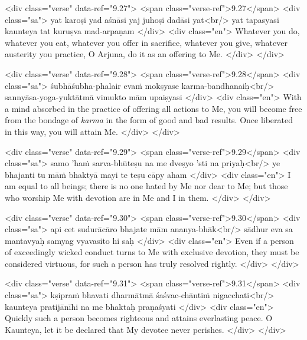 \begin{html}
<div class="verse" data-ref="9.27">
  <span class="verse-ref">9.27</span>
  <div class="sa">
    yat karoṣi yad aśnāsi yaj juhoṣi dadāsi yat<br/>
    yat tapasyasi kaunteya tat kuruṣva mad-arpaṇam
  </div>
  <div class="en">
    Whatever you do, whatever you eat, whatever you offer in sacrifice, whatever you give, whatever austerity you practice, O Arjuna, do it as an offering to Me.
  </div>
</div>
\end{html}



\begin{html}
<div class="verse" data-ref="9.28">
  <span class="verse-ref">9.28</span>
  <div class="sa">
    śubhāśubha-phalair evaṁ mokṣyase karma-bandhanaiḥ<br/>
    sannyāsa-yoga-yuktātmā vimukto mām upaiṣyasi
  </div>
  <div class="en">
    With a mind absorbed in the practice of offering all actions to Me, you will become free from the bondage of \textit{karma} in the form of good and bad results. Once liberated in this way, you will attain Me.
  </div>
</div>
\end{html}



\begin{html}
<div class="verse" data-ref="9.29">
  <span class="verse-ref">9.29</span>
  <div class="sa">
    samo ’haṁ sarva-bhūteṣu na me dveṣyo ’sti na priyaḥ<br/>
    ye bhajanti tu māṁ bhaktyā mayi te teṣu cāpy aham
  </div>
  <div class="en">
    I am equal to all beings; there is no one hated by Me nor dear to Me; but those who worship Me with devotion are in Me and I in them.
  </div>
</div>
\end{html}



\begin{html}
<div class="verse" data-ref="9.30">
  <span class="verse-ref">9.30</span>
  <div class="sa">
    api cet sudurācāro bhajate mām ananya-bhāk<br/>
    sādhur eva sa mantavyaḥ samyag vyavasito hi saḥ
  </div>
  <div class="en">
    Even if a person of exceedingly wicked conduct turns to Me with exclusive devotion, they must be considered virtuous, for such a person has truly resolved rightly.
  </div>
</div>
\end{html}



\begin{html}
<div class="verse" data-ref="9.31">
  <span class="verse-ref">9.31</span>
  <div class="sa">
    kṣipraṁ bhavati dharmātmā śaśvac-chāntiṁ nigacchati<br/>
    kaunteya pratijānīhi na me bhaktaḥ praṇaśyati
  </div>
  <div class="en">
    Quickly such a person becomes righteous and attains everlasting peace. O Kaunteya, let it be declared that My devotee never perishes.
  </div>
</div>
\end{html}



